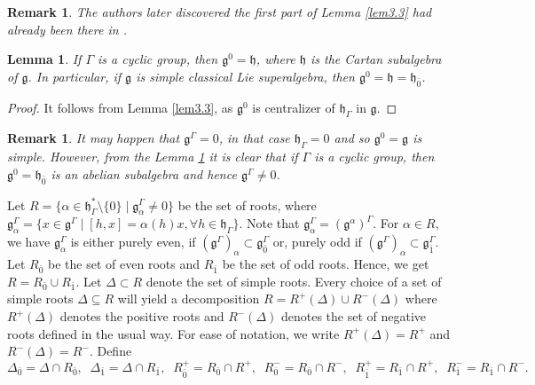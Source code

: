 \documentclass[11pt]{amsart}
\theoremstyle{plain}
\newtheorem{lemma}[thm]{Lemma}
\newtheorem{rem}[thm]{Remark}
\theoremstyle{definition}
\newcommand{\g}{\mathfrak{g}}
\newcommand{\h}{\mathfrak{h}}
\begin{document}
\begin{rem}
    The authors later discovered the first part of Lemma \ref{lem3.3} had already been there in \cite{vdL}.
\end{rem}
 \begin{lemma}\label{lem 3.4}
If $\Gamma$ is a cyclic group, then $\g^{0}=\h$, where $\h$ is the Cartan subalgebra of $\g$. In particular, if $\g$ is simple classical Lie superalgebra, then $\g^{0}=\h=\h_{\bar{0}}$.
\end{lemma}
\begin{proof}
It follows from Lemma \ref{lem3.3}, as $\g^{0}$ is centralizer of $\h_{\Gamma}$ in $\g$.
\end{proof}
\begin{rem}
It may happen that $\g^{\Gamma}=0$, in that case $\h_{\Gamma}=0$ and so $\g^{0}=\g$ is simple. However, from the Lemma \ref{lem 3.4} it is clear that if $\Gamma$ is a cyclic group, then $\g^{0}=\h_{\bar{0}}$ is an abelian subalgebra and hence $\g^{\Gamma}\neq 0$.
\end{rem}


Let $R =\{\alpha\in
\h_{\Gamma}^{*}\setminus \{0\}\mid \g^{\Gamma}_{\alpha}\neq 0\}$ \label{pg:3} be the set of roots, where $\g^{\Gamma}_{\alpha}=\{x\in\g^{\Gamma}\mid [h, x]=\alpha(h)x, \forall h\in \h_{\Gamma}\}$. Note that $\g^{\Gamma}_{\alpha}=(\g^{\alpha})^{\Gamma}$. For $\alpha\in R$, we have $\g^{\Gamma}_{\alpha}$ is either purely even, if $(\g^{\Gamma})_{\alpha}\subset\g_{\bar{0}}^{\Gamma}$ or, purely odd if $(\g^{\Gamma})_{\alpha}\subset\g_{\bar{1}}^{\Gamma}$. Let $R_{\bar{0}}$ be the set of even roots and $R_{\bar{1}}$ be the set of odd roots. Hence, we get $R=R_{\bar{0}}\cup R_{\bar{1}}$.
Let $\Delta\subset R$ denote the set of simple roots. Every choice of a set of simple roots $\Delta\subseteq R$ will yield a decomposition $R=R^{+}(\Delta)\cup R^{-}(\Delta)$ where $R^{+}(\Delta)$ denotes the positive roots and $R^{-}(\Delta)$ denotes the set of negative roots defined in the usual way. For ease of notation, we write $R^{+}(\Delta)=R^{+}$ and $R^{-}(\Delta)=R^{-}$. Define
\begin{equation*}
\Delta_{\bar{0}}=\Delta\cap R_{\bar{0}},\;\; \Delta_{\bar{1}}=\Delta\cap R_{\bar{1}},
    \;\; R^{+}_{\bar{0}}=R_{\bar{0}}\cap R^+,\;\; R^{-}_{\bar{0}}=R_{\bar{0}}\cap R^-,\;\;  R^{+}_{\bar{1}}=R_{\bar{1}}\cap R^+,\;\; 
    R^{-}_{\bar{1}}=R_{\bar{1}}\cap R^-.
\end{equation*}
\end{document}
